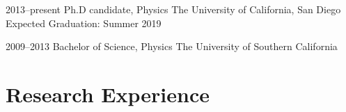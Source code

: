 \documentclass[]{friggeri-cv} %
\begin{document}
\begin{entrylist}


\entry
{2013--present}
{Ph.D candidate, {\normalfont Physics}}
{The University of California, San Diego}
{Expected Graduation: Summer 2019
}


\entry
{2009--2013}
{Bachelor of Science, {\normalfont Physics}}
{The University of Southern California}

\end{entrylist}




\section{Research Experience}
\end{document}
